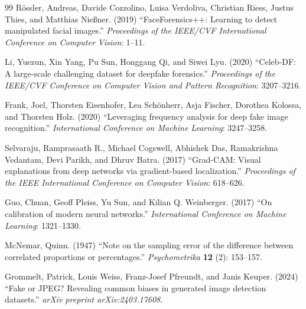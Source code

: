 \documentclass[3p,times,procedia]{elsarticle}
\begin{document}
\begin{thebibliography}{99}
R\"{o}ssler, Andreas, Davide Cozzolino, Luisa Verdoliva, Christian Riess,
Justus Thies, and Matthias Nie{\ss}ner. (2019) ``FaceForensics++: Learning
to detect manipulated facial images.'' \textit{Proceedings of the IEEE/CVF
International Conference on Computer Vision}: 1--11.

Li, Yuezun, Xin Yang, Pu Sun, Honggang Qi, and Siwei Lyu. (2020)
``Celeb-DF: A large-scale challenging dataset for deepfake forensics.''
\textit{Proceedings of the IEEE/CVF Conference on Computer Vision and
Pattern Recognition}: 3207--3216.

Frank, Joel, Thorsten Eisenhofer, Lea Sch\"{o}nherr, Asja Fischer, Dorothea
Kolossa, and Thorsten Holz. (2020) ``Leveraging frequency analysis for
deep fake image recognition.'' \textit{International Conference on Machine
Learning}: 3247--3258.

Selvaraju, Ramprasaath R., Michael Cogswell, Abhishek Das, Ramakrishna
Vedantam, Devi Parikh, and Dhruv Batra. (2017) ``Grad-CAM: Visual
explanations from deep networks via gradient-based localization.''
\textit{Proceedings of the IEEE International Conference on Computer
Vision}: 618--626.

Guo, Chuan, Geoff Pleiss, Yu Sun, and Kilian Q. Weinberger. (2017) ``On
calibration of modern neural networks.'' \textit{International Conference
on Machine Learning}: 1321--1330.

McNemar, Quinn. (1947) ``Note on the sampling error of the difference
between correlated proportions or percentages.'' \textit{Psychometrika}
\textbf{12} (2): 153--157.

Grommelt, Patrick, Louis Weiss, Franz-Josef Pfreundt, and Janis Keuper.
(2024) ``Fake or JPEG? Revealing common biases in generated image
detection datasets.'' \textit{arXiv preprint arXiv:2403.17608}.

\end{thebibliography}
\end{document}
